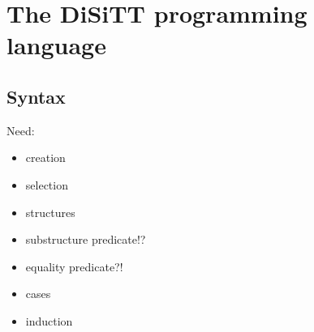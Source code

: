 \chapter{The DiSiTT programming language}

\section{Syntax}

Need: 

\begin{itemize}
\item creation
\item selection
\item structures
\item substructure predicate!?
\item equality predicate?!
\item cases
\item induction
\end{itemize}